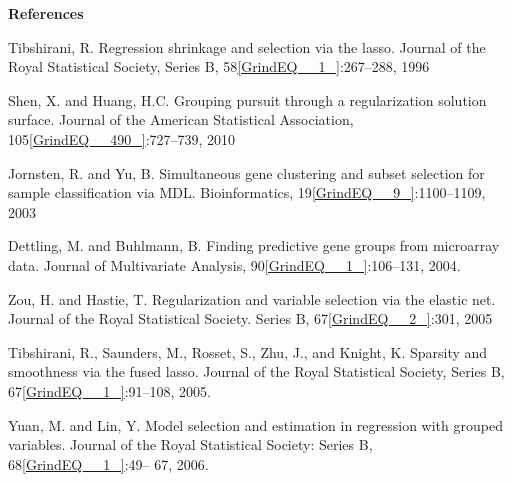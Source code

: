 \documentclass{article} %
\begin{document}
\noindent 

\noindent 

\noindent 

\noindent 

\noindent 

\noindent 

\noindent 

\noindent 

\noindent 

\noindent 

\noindent 

\noindent 

\noindent 

\noindent 

\noindent 

\noindent 

\noindent 

\noindent 

\noindent 

\noindent 

\noindent \textbf{References}

\noindent [1] Tibshirani, R. Regression shrinkage and selection via the lasso. Journal of the Royal Statistical Society, Series B, 58\eqref{GrindEQ__1_}:267--288, 1996\textbf{}

\noindent [2] Shen, X. and Huang, H.C. Grouping pursuit through a regularization solution surface. Journal of the American Statistical Association, 105\eqref{GrindEQ__490_}:727--739, 2010\textbf{}

\noindent [3] Jornsten, R. and Yu, B. Simultaneous gene clustering and subset selection for sample classification via MDL. Bioinformatics, 19\eqref{GrindEQ__9_}:1100--1109, 2003\textbf{}

\noindent [4] Dettling, M. and Buhlmann, B. Finding predictive gene groups from microarray data. Journal of  Multivariate Analysis, 90\eqref{GrindEQ__1_}:106--131, 2004.\textbf{}

\noindent [5] Zou, H. and Hastie, T. Regularization and variable selection via the elastic net. Journal of the Royal  Statistical Society. Series B, 67\eqref{GrindEQ__2_}:301, 2005\textbf{}

\noindent [6] Tibshirani, R., Saunders, M., Rosset, S., Zhu, J., and Knight, K. Sparsity and smoothness via the fused lasso. Journal of the Royal Statistical Society, Series B, 67\eqref{GrindEQ__1_}:91--108, 2005.\textbf{}

\noindent [7] Yuan, M. and Lin, Y. Model selection and estimation in regression with grouped variables. Journal of the Royal Statistical Society: Series B, 68\eqref{GrindEQ__1_}:49-- 67, 2006. \textbf{}
\end{document}
